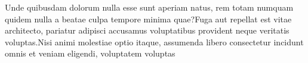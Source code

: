 \documentclass[letterpaper]{article} %
\begin{document}
{
\fontsize{9pt}{10pt} \selectfont
Unde quibusdam dolorum nulla esse sunt aperiam natus, rem totam numquam quidem nulla a beatae culpa tempore minima quae?Fuga aut repellat est vitae architecto, pariatur adipisci accusamus voluptatibus provident neque veritatis voluptas.Nisi animi molestiae optio itaque, assumenda libero consectetur incidunt omnis et veniam eligendi, voluptatem voluptas


}
\end{document}
